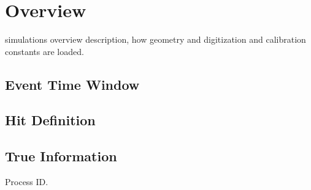 \section{Overview}





simulations overview description, how geometry and digitization and calibration constants are loaded.

\subsection{Event Time Window}
\subsection{Hit Definition}
\subsection{True Information}
Process ID.








